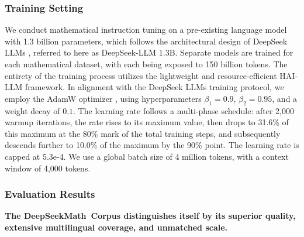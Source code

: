 \subsubsection{Training Setting}
\label{sec:quality-policy}
We conduct mathematical instruction tuning on a pre-existing language model with 1.3 billion parameters, which follows the architectural design of DeepSeek LLMs \citep{deepseek-llm}, referred to here as DeepSeek-LLM 1.3B. Separate models are trained for each mathematical dataset, with each being exposed to 150 billion tokens. The entirety of the training process utilizes the lightweight and resource-efficient HAI-LLM \citep{haillm} framework. In alignment with the DeepSeek LLMs training protocol, we employ the AdamW optimizer \citep{adamW}, using hyperparameters $\beta_1=0.9$, $\beta_2=0.95$, and a weight decay of $0.1$. The learning rate follows a multi-phase schedule: after 2,000 warmup iterations, the rate rises to its maximum value, then drops to 31.6\% of this maximum at the 80\% mark of the total training steps, and subsequently descends further to 10.0\% of the maximum by the 90\% point. The learning rate is capped at 5.3e-4. We use a global batch size of 4 million tokens, with a context window of 4,000 tokens.

\subsubsection{Evaluation Results}

\textbf{The DeepSeekMath~Corpus distinguishes itself by its superior quality, extensive multilingual coverage, and unmatched scale.}


